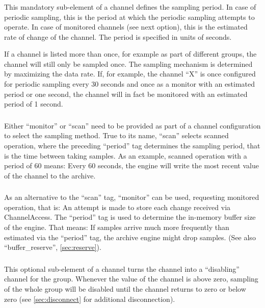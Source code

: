 \subsubsection{} \label{sec:period}
This mandatory sub-element of a channel defines the sampling period.
In case of periodic sampling, this is the period at which the periodic
sampling attempts to operate. In case of monitored channels (see next
option), this is the estimated rate of change of the channel.
The period is specified in units of seconds.

If a channel is listed more than once, for example as part of
different groups, the channel will still only be sampled once. The
sampling mechanism is determined by maximizing the data rate. If, for
example, the channel ``X'' is once configured for periodic sampling
every 30 seconds and once as a monitor with an estimated period or one
second, the channel will in fact be monitored with an estimated period
of 1 second.

\subsubsection{}
Either ``monitor'' or ``scan'' need to be provided as part of a
channel configuration to select the sampling method.  
True to its name, ``scan'' selects scanned operation, where the preceding
``period'' tag determines the sampling period, that is the time
between taking samples.
As an example, scanned operation with a period of 60 means: Every 60
seconds, the engine will write the most recent value of the channel to
the archive.

\subsubsection{}
As an alternative to the ``scan'' tag, ``monitor'' can be used,
requesting monitored operation, that is: An attempt is made to store
each change received via ChannelAccess. The ``period'' tag is used to
determine the in-memory buffer size of the engine. That means: If
samples arrive much more frequently than estimated via the ``period''
tag, the archive engine might drop samples. (See also
``buffer\_reserve'', \ref{sec:reserve}).


\subsubsection{} \label{sec:disable}
This optional sub-element of a channel turns the channel into a
``disabling'' channel for the group. Whenever the value of the channel
is above zero, sampling of the whole group will be disabled until the
channel returns to zero or below zero
(see \ref{sec:disconnect} for additional disconnection).

